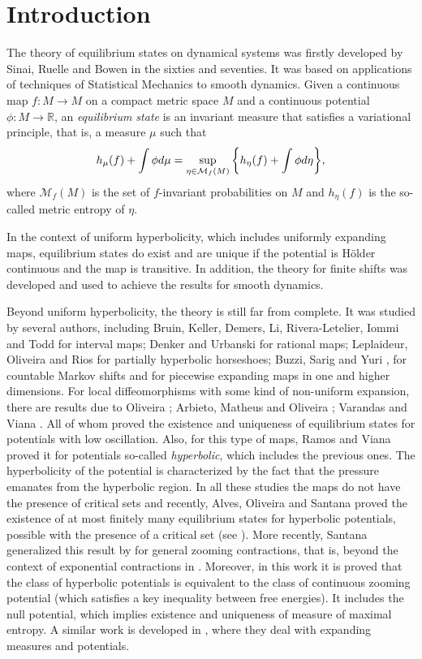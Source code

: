 \documentclass[12pt,a4paper]{amsart}
\theoremstyle{plain}
\begin{document}
	
	
	
	
	\section{Introduction}
	The theory of equilibrium states on dynamical systems was firstly developed by Sinai, Ruelle and Bowen in the sixties and seventies. 
	It was based on applications of techniques of Statistical Mechanics to smooth dynamics.
	Given a continuous map $f: M \to M$ on a compact metric space $M$ and a continuous potential $\phi : M \to \mathbb{R}$, an  {\textit{equilibrium state}} is an 
	invariant measure that satisfies a variational principle, that is, a measure $\mu$ such that
	$$
	\displaystyle h_{\mu}(f) + \int \phi d\mu = \sup_{\eta \in \mathcal{M}_{f}(M)} \bigg{\{} h_{\eta}(f) + \int \phi d\eta \bigg{\}},
	$$
	where $\mathcal{M}_{f}(M)$ is the set of $f$-invariant probabilities on $M$ and $h_{\eta}(f)$ is the so-called metric entropy of $\eta$.
	
	
	In the context of uniform hyperbolicity, which includes uniformly expanding maps, equilibrium states do exist and are unique if the potential is H\"older continuous
	and the map is transitive. In addition, the theory for finite shifts was developed and used to achieve the results for smooth dynamics.
	
	Beyond uniform hyperbolicity, the theory is still far from complete. It was studied by several authors, including Bruin, Keller, Demers, Li, Rivera-Letelier, Iommi and Todd 
	\cite{BK,IT1,IT2,LRL} for interval maps; Denker and Urbanski  \cite{DU} for rational maps; Leplaideur, Oliveira and Rios 
	\cite{LOR} for partially hyperbolic horseshoes; Buzzi, Sarig and Yuri \cite{BS,Y}, for countable Markov shifts and for piecewise expanding maps in one and higher dimensions. 
	For local diffeomorphisms with some kind of non-uniform expansion, there are results due to Oliveira \cite{O}; Arbieto, Matheus and Oliveira \cite{AMO};
	Varandas and Viana \cite{VV}. All of whom proved the existence and uniqueness of equilibrium states for potentials with low oscillation. Also, for this type of maps,
	Ramos and Viana  \cite{RV}  proved it for potentials so-called \textit{hyperbolic}, which includes the previous ones. The hyperbolicity of the potential is
	characterized by the fact that the pressure emanates from the hyperbolic region. In all these studies the maps do not have the presence of critical sets and recently, Alves, Oliveira and Santana proved the existence of at most finitely many equilibrium states for hyperbolic potentials, possible with the presence of a critical set (see \cite{AOS}). More recently, Santana generalized this result by for general zooming contractions, that is, beyond the context of exponential contractions in \cite{S}. Moreover, in this work it is proved that the class of hyperbolic potentials is equivalent to the class of continuous zooming potential (which satisfies a key inequality between free energies). It includes the null potential, which implies existence and uniqueness of measure of maximal entropy. A similar work is developed in \cite{PV}, where they deal with expanding measures and potentials.
	
\end{document}
